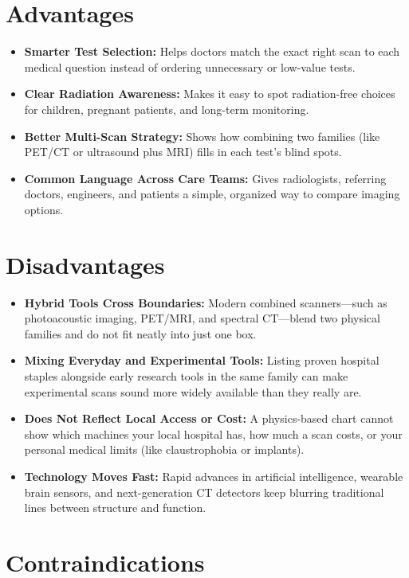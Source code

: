 \section{Advantages}
\begin{itemize}
  \item \textbf{Smarter Test Selection:} Helps doctors match the exact right scan to each medical question instead of ordering unnecessary or low-value tests.
  \item \textbf{Clear Radiation Awareness:} Makes it easy to spot radiation-free choices for children, pregnant patients, and long-term monitoring.
  \item \textbf{Better Multi-Scan Strategy:} Shows how combining two families (like PET/CT or ultrasound plus MRI) fills in each test's blind spots.
  \item \textbf{Common Language Across Care Teams:} Gives radiologists, referring doctors, engineers, and patients a simple, organized way to compare imaging options.
\end{itemize}

\section{Disadvantages}
\begin{itemize}
  \item \textbf{Hybrid Tools Cross Boundaries:} Modern combined scanners---such as photoacoustic imaging, PET/MRI, and spectral CT---blend two physical families and do not fit neatly into just one box.
  \item \textbf{Mixing Everyday and Experimental Tools:} Listing proven hospital staples alongside early research tools in the same family can make experimental scans sound more widely available than they really are.
  \item \textbf{Does Not Reflect Local Access or Cost:} A physics-based chart cannot show which machines your local hospital has, how much a scan costs, or your personal medical limits (like claustrophobia or implants).
  \item \textbf{Technology Moves Fast:} Rapid advances in artificial intelligence, wearable brain sensors, and next-generation CT detectors keep blurring traditional lines between structure and function.
\end{itemize}

\section{Contraindications}

